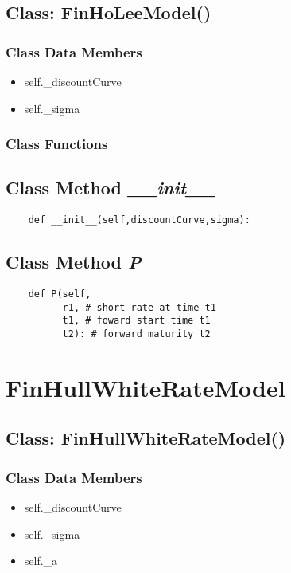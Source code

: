 \documentclass[twoside,11pt]{book}
\begin{document}
\subsection{Class: FinHoLeeModel()}


\subsubsection{Class Data Members}
\begin{itemize}
\item{self.\_discountCurve}
\item{self.\_sigma}
\end{itemize}

\subsubsection{Class Functions}

\subsection{Class Method {\it \_\_init\_\_}}


\begin{lstlisting}
    def __init__(self,discountCurve,sigma):
\end{lstlisting}

\subsection{Class Method {\it P}}


\begin{lstlisting}
    def P(self,
          r1, # short rate at time t1
          t1, # foward start time t1
          t2): # forward maturity t2
\end{lstlisting}

\newpage
\section{FinHullWhiteRateModel}

\subsection{Class: FinHullWhiteRateModel()}


\subsubsection{Class Data Members}
\begin{itemize}
\item{self.\_discountCurve}
\item{self.\_sigma}
\item{self.\_a}
\end{itemize}
\end{document}
